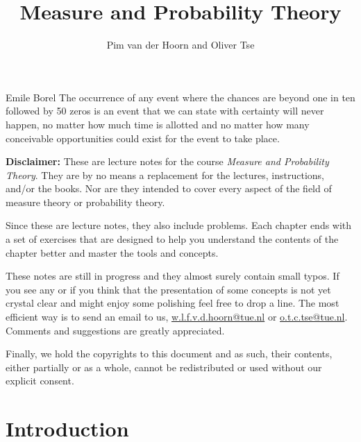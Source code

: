 \documentclass{lecturenotes}
\begin{document}
\begin{titlepage}
    \title{Measure and Probability Theory}
    \author{Pim van der Hoorn and Oliver Tse}
    \maketitle
\end{titlepage}

\begin{chapquote}[30pt]{Emile Borel}
The occurrence of any event where the chances are beyond one in ten followed by 50 zeros is an event that we can state with certainty will never happen, no matter how much time is allotted and no matter how many conceivable opportunities could exist for the event to take place.
\end{chapquote}
\vfill
\noindent\textbf{Disclaimer:}
These are lecture notes for the course \emph{Measure and Probability Theory}. They are by no means a replacement for the lectures, instructions, and/or the books. Nor are they intended to cover every aspect of the field of measure theory or probability theory.

Since these are lecture notes, they also include problems. Each chapter ends with a set of exercises that are designed to help you understand the contents of the chapter better and master the tools and concepts.

These notes are still in progress and they almost surely contain small typos. If you see any or if you think that the presentation of some concepts is not yet crystal clear and might enjoy some polishing feel free to drop a line. The most efficient way is to send an email to us, \href{mailto:w.l.f.v.d.hoorn@tue.nl}{w.l.f.v.d.hoorn@tue.nl} or \href{mailto:o.t.c.tse@tue.nl}{o.t.c.tse@tue.nl}. Comments and suggestions are greatly appreciated.

Finally, we hold the copyrights to this document and as such, their contents, either partially or as a whole, cannot be redistributed or used without our explicit consent.

\newpage

\tableofcontents

\chapter{Introduction}
\label{chapter:introduction}

\end{document}
